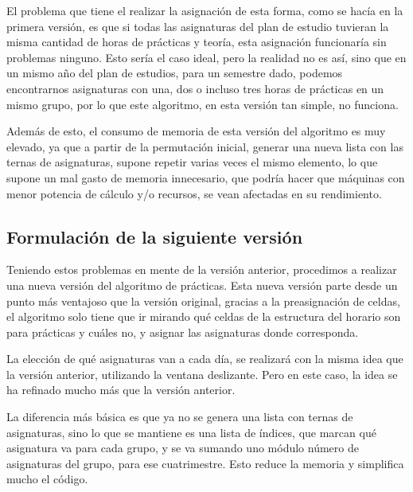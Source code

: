 El problema que tiene el realizar la asignación de esta forma, como se hacía en la primera versión, es que si todas las asignaturas del plan de estudio tuvieran la misma cantidad de horas de prácticas y teoría, esta asignación funcionaría sin problemas ninguno. Esto sería el caso ideal, pero la realidad no es así, sino que en un mismo año del plan de estudios, para un semestre dado, podemos encontrarnos asignaturas con una, dos o incluso tres horas de prácticas en un mismo grupo, por lo que este algoritmo, en esta versión tan simple, no funciona. 

Además de esto, el consumo de memoria de esta versión del algoritmo es muy elevado, ya que a partir de la permutación inicial, generar una nueva lista con las ternas de asignaturas, supone repetir varias veces el mismo elemento, lo que supone un mal gasto de memoria innecesario, que podría hacer que máquinas con menor potencia de cálculo y/o recursos, se vean afectadas en su rendimiento.

\subsection{Formulación de la siguiente versión}

Teniendo estos problemas en mente de la versión anterior, procedimos a realizar una nueva versión del algoritmo de prácticas. Esta nueva versión parte desde un punto más ventajoso que la versión original, gracias a la preasignación de celdas, el algoritmo solo tiene que ir mirando qué celdas de la estructura del horario son para prácticas y cuáles no, y asignar las asignaturas donde corresponda.

La elección de qué asignaturas van a cada día, se realizará con la misma idea que la versión anterior, utilizando la ventana deslizante. Pero en este caso, la idea se ha refinado mucho más que la versión anterior. 

La diferencia más básica es que ya no se genera una lista con ternas de asignaturas, sino lo que se mantiene es una lista de índices, que marcan qué asignatura va para cada grupo, y se va sumando uno módulo número de asignaturas del grupo, para ese cuatrimestre. Esto reduce la memoria y simplifica mucho el código.

